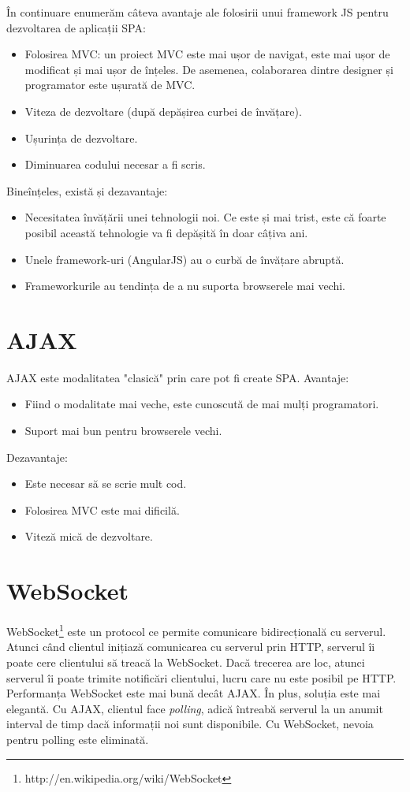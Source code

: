 În continuare enumerăm câteva avantaje ale folosirii unui framework JS pentru
dezvoltarea de aplicații SPA:
\begin{itemize}
  \item Folosirea MVC: un proiect MVC este mai ușor de navigat, este mai ușor
  de modificat și mai ușor de înțeles. De asemenea, colaborarea dintre
  designer și programator este ușurată de MVC.
  \item Viteza de dezvoltare (după depășirea curbei de învățare).
  \item Ușurința de dezvoltare.
  \item Diminuarea codului necesar a fi scris.
\end{itemize}

Bineînțeles, există și dezavantaje:
\begin{itemize}
  \item Necesitatea învățării unei tehnologii noi. Ce este și mai trist, este
  că foarte posibil această tehnologie va fi depășită în doar câțiva ani.
  \item Unele framework-uri (AngularJS) au o curbă de învățare abruptă.
  \item Frameworkurile au tendința de a nu suporta browserele mai vechi.
\end{itemize}


\section{AJAX}
AJAX este modalitatea "clasică" prin care pot fi create SPA.
Avantaje:
\begin{itemize}
\item Fiind o modalitate mai veche, este cunoscută de mai mulți programatori.
\item Suport mai bun pentru browserele vechi.
\end{itemize}
Dezavantaje:
\begin{itemize}
\item Este necesar să se scrie mult cod.
\item Folosirea MVC este mai dificilă.
\item Viteză mică de dezvoltare.
\end{itemize}

\section{WebSocket}
WebSocket\footnote{http://en.wikipedia.org/wiki/WebSocket} este un protocol
ce permite comunicare bidirecțională cu serverul. Atunci când clientul
inițiază comunicarea cu serverul prin HTTP, serverul îi poate cere clientului
să treacă la WebSocket. Dacă trecerea are loc, atunci serverul îi poate trimite
notificări clientului, lucru care nu este posibil pe HTTP.
Performanța WebSocket este mai bună decât AJAX. În plus, soluția este mai elegantă.
Cu AJAX, clientul face \emph{polling}, adică întreabă serverul la un anumit interval
de timp dacă informații noi sunt disponibile. Cu WebSocket, nevoia pentru polling
este eliminată.

